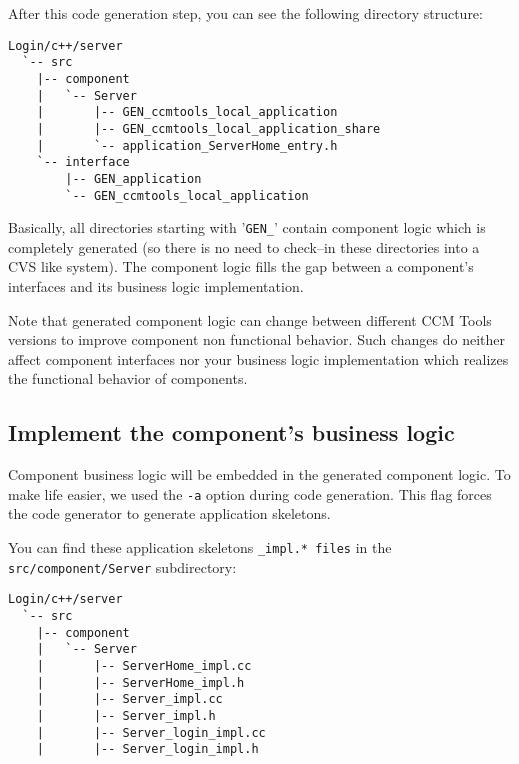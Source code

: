 After this code generation step, you can see the following directory structure:
\begin{footnotesize}
\begin{verbatim}
Login/c++/server
  `-- src
    |-- component
    |   `-- Server
    |       |-- GEN_ccmtools_local_application
    |       |-- GEN_ccmtools_local_application_share
    |       `-- application_ServerHome_entry.h
    `-- interface
        |-- GEN_application
        `-- GEN_ccmtools_local_application
\end{verbatim}
\end{footnotesize}

Basically, all directories starting with '{\tt GEN\_}' contain component logic
which is completely generated (so there is no need to check--in these directories
into a CVS like system).
The component logic fills the gap between a component's interfaces and its
business logic implementation. 

\vspace{3mm}
Note that generated component logic can change between different CCM Tools
versions to improve component non functional behavior. Such changes do neither
affect component interfaces nor your business logic implementation which
realizes the functional behavior of components.   


\subsection{Implement the component's business logic}
\label{subsection:ImplementC++BusinessLogic}

Component business logic will be embedded in the generated component logic.
To make life easier, we used the {\tt -a} option during code generation.
This flag forces the code generator to generate application skeletons.

\vspace{3mm}
You can find these application skeletons {\tt *\_impl.* files} in the 
{\tt src/component/Server} subdirectory:
\begin{footnotesize}
\begin{verbatim}
Login/c++/server
  `-- src
    |-- component
    |   `-- Server
    |       |-- ServerHome_impl.cc
    |       |-- ServerHome_impl.h
    |       |-- Server_impl.cc
    |       |-- Server_impl.h
    |       |-- Server_login_impl.cc
    |       |-- Server_login_impl.h
\end{verbatim}
\end{footnotesize}

